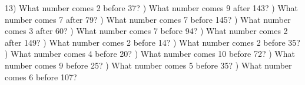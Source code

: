 \documentclass{article}%
\begin{document}
13) What number comes 2 before 37?%
\newline%
\newline%
) What number comes 9 after 143?%
\newline%
\newline%
) What number comes 7 after 79?%
\newline%
\newline%
) What number comes 7 before 145?%
\newline%
\newline%
) What number comes 3 after 60?%
\newline%
\newline%
) What number comes 7 before 94?%
\newline%
\newline%
) What number comes 2 after 149?%
\newline%
\newline%
) What number comes 2 before 14?%
\newline%
\newline%
) What number comes 2 before 35?%
\newline%
\newline%
) What number comes 4 before 20?%
\newline%
\newline%
) What number comes 10 before 72?%
\newline%
\newline%
) What number comes 9 before 25?%
\newline%
\newline%
) What number comes 5 before 35?%
\newline%
\newline%
) What number comes 6 before 107?%
\newline%
\newline%
\newline%
\end{document}
